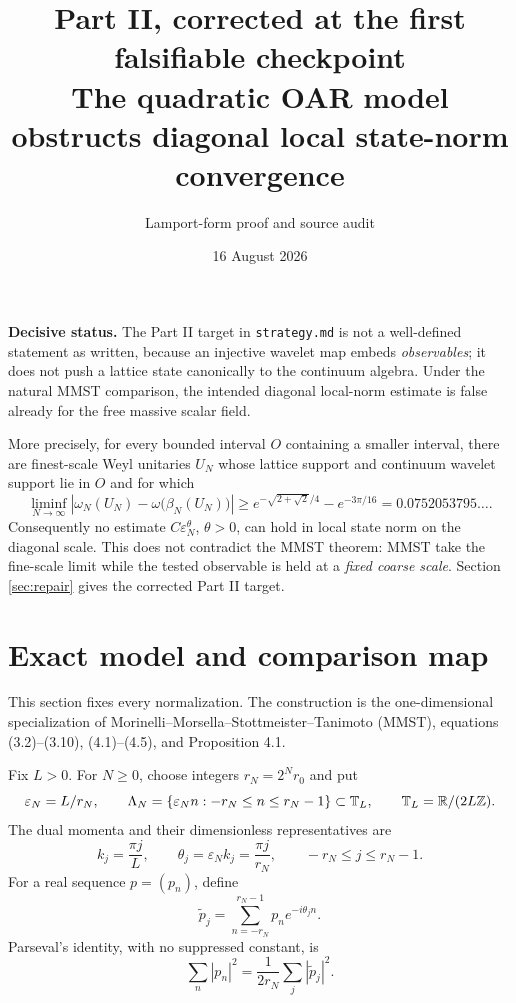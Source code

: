 \documentclass[11pt,a4paper]{article}
\title{Part II, corrected at the first falsifiable checkpoint\\[3pt]
\large The quadratic OAR model obstructs diagonal local state-norm convergence}
\author{Lamport-form proof and source audit}
\date{16 August 2026}
\newcommand{\T}{\mathbb T}
\newcommand{\eps}{\varepsilon}
\begin{document}
\maketitle

\begin{resultbox}
\textbf{Decisive status.}  The Part II target in \texttt{strategy.md} is not a
well-defined statement as written, because an injective wavelet map embeds
\emph{observables}; it does not push a lattice state canonically to the continuum
algebra.  Under the natural MMST comparison, the intended diagonal local-norm
estimate is false already for the free massive scalar field.

More precisely, for every bounded interval $O$ containing a smaller interval, there
are finest-scale Weyl unitaries $U_N$ whose lattice support and continuum wavelet
support lie in $O$ and for which
\[
 \liminf_{N\to\infty}
 \left|\omega_N(U_N)-\omega\bigl(\beta_N(U_N)\bigr)\right|
 \geq e^{-\sqrt{2+\sqrt2}/4}-e^{-3\pi/16}
 =0.0752053795\ldots.                                            \tag{R}
\]
Consequently no estimate $C\eps_N^\theta$, $\theta>0$, can hold in local state
norm on the diagonal scale.  This does not contradict the MMST theorem: MMST take
the fine-scale limit while the tested observable is held at a \emph{fixed coarse
scale}.  Section \ref{sec:repair} gives the corrected Part II target.
\end{resultbox}

\tableofcontents

\section{Exact model and comparison map}\label{sec:model}

This section fixes every normalization.  The construction is the one-dimensional
specialization of Morinelli--Morsella--Stottmeister--Tanimoto (MMST), equations
(3.2)--(3.10), (4.1)--(4.5), and Proposition 4.1.

Fix $L>0$.  For $N\geq0$, choose integers $r_N=2^Nr_0$ and put
\[
 \eps_N=L/r_N,\qquad
 \Lambda_N=\{\eps_N n:-r_N\leq n\leq r_N-1\}\subset\T_L,
 \qquad \T_L=\R/(2L\mathbb Z).
\]
The dual momenta and their dimensionless representatives are
\[
 k_j=\frac{\pi j}{L},\qquad
 \theta_j=\eps_Nk_j=\frac{\pi j}{r_N},\qquad
 -r_N\leq j\leq r_N-1.                                         \tag{1.1}
\]
For a real sequence $p=(p_n)$, define
\[
 \widetilde p_j=\sum_{n=-r_N}^{r_N-1}p_ne^{-i\theta_jn}.
\]
Parseval's identity, with no suppressed constant, is
\[
 \sum_n|p_n|^2=\frac1{2r_N}\sum_j|\widetilde p_j|^2.             \tag{1.2}
\]
\end{document}
